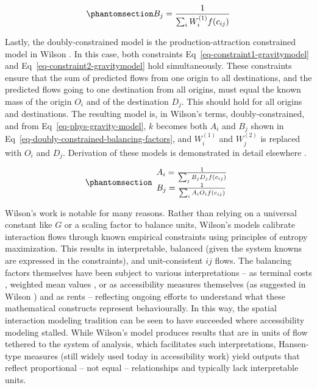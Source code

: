 \documentclass[
  10pt,
  letterpaper,
]{article}
\begin{document}
\begin{equation}\phantomsection\label{eq-attraction-constrained-balancing-factor}{
B_j = \frac{1}{\sum_i W_i^{(1)} f(c_{ij})}
}\end{equation}

Lastly, the doubly-constrained model is the production-attraction
constrained model in Wilson \citep{wilson1971}. In this case, both
constraints Eq~\ref{eq-constraint1-gravitymodel} and
Eq~\ref{eq-constraint2-gravitymodel} hold simultaneously. These
constraints ensure that the sum of predicted flows from one origin to
all destinations, and the predicted flows going to one destination from
all origins, must equal the known mass of the origin \(O_i\) and of the
destination \(D_j\). This should hold for all origins and destinations.
The resulting model is, in Wilson's terms, doubly-constrained, and from
Eq~\ref{eq-phys-gravity-model}, \(k\) becomes both \(A_i\) and \(B_j\)
shown in Eq~\ref{eq-doubly-constrained-balancing-factors}, and
\(W_i^{(1)}\) and \(W_j^{(2)}\) is replaced with \(O_i\) and \(D_j\).
Derivation of these models is demonstrated in detail elsewhere
\citep[e.g.,][]{ortuzar_2011_modelling, wilsonSTATISTICALTHEORYSPATIAL1967}.

\begin{equation}\phantomsection\label{eq-doubly-constrained-balancing-factors}{
\begin{array}{l}
A_i = \frac{1}{\sum_j B_j D_j f(c_{ij})}\\
B_j = \frac{1}{\sum_i A_i O_i f(c_{ij})}
\end{array}
}\end{equation}

Wilson's work is notable for many reasons. Rather than relying on a
universal constant like \(G\) or a scaling factor to balance units,
Wilson's models calibrate interaction flows through known empirical
constraints using principles of entropy maximization. This results in
interpretable, balanced (given the system knowns are expressed in the
constraints), and unit-consistent \(ij\) flows. The balancing factors
themselves have been subject to various interpretations -- as terminal
costs \citep{dieter1962distribution}, weighted mean values
\citep{kirbyNormalizingFactorsGravity1970}, or as accessibility measures
themselves \citep{cesario1977new} (as suggested in Wilson
\citep{wilson1971}) and as rents
\citep{morphetGravityModelCalibration2023} -- reflecting ongoing efforts
to understand what these mathematical constructs represent
behaviourally. In this way, the spatial interaction modeling tradition
can be seen to have succeeded where accessibility modeling stalled.
While Wilson's model produces results that are in units of flow tethered
to the system of analysis, which facilitates such interpretations,
Hansen-type measures (still widely used today in accessibility work)
yield outputs that reflect proportional -- not equal -- relationships
and typically lack interpretable units.
\end{document}
